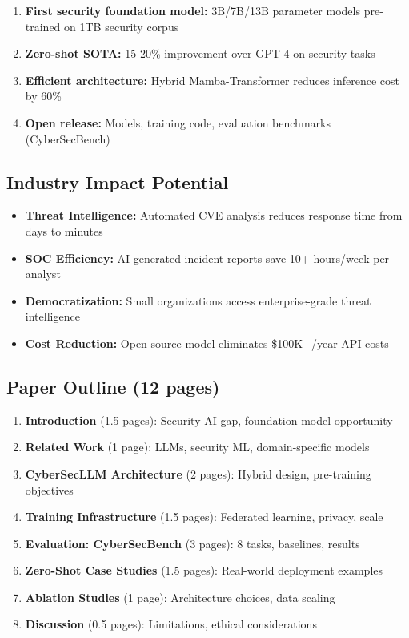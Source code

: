 \documentclass[11pt,letterpaper]{article}
\begin{document}
\begin{enumerate}
\item \textbf{First security foundation model:} 3B/7B/13B parameter models pre-trained on 1TB security corpus
\item \textbf{Zero-shot SOTA:} 15-20\% improvement over GPT-4 on security tasks
\item \textbf{Efficient architecture:} Hybrid Mamba-Transformer reduces inference cost by 60\%
\item \textbf{Open release:} Models, training code, evaluation benchmarks (CyberSecBench)
\end{enumerate}

\subsection{Industry Impact Potential}

\begin{itemize}
\item \textbf{Threat Intelligence:} Automated CVE analysis reduces response time from days to minutes
\item \textbf{SOC Efficiency:} AI-generated incident reports save 10+ hours/week per analyst
\item \textbf{Democratization:} Small organizations access enterprise-grade threat intelligence
\item \textbf{Cost Reduction:} Open-source model eliminates \$100K+/year API costs
\end{itemize}

\subsection{Paper Outline (12 pages)}

\begin{enumerate}
\item \textbf{Introduction} (1.5 pages): Security AI gap, foundation model opportunity
\item \textbf{Related Work} (1 page): LLMs, security ML, domain-specific models
\item \textbf{CyberSecLLM Architecture} (2 pages): Hybrid design, pre-training objectives
\item \textbf{Training Infrastructure} (1.5 pages): Federated learning, privacy, scale
\item \textbf{Evaluation: CyberSecBench} (3 pages): 8 tasks, baselines, results
\item \textbf{Zero-Shot Case Studies} (1.5 pages): Real-world deployment examples
\item \textbf{Ablation Studies} (1 page): Architecture choices, data scaling
\item \textbf{Discussion} (0.5 pages): Limitations, ethical considerations
\end{enumerate}
\end{document}
